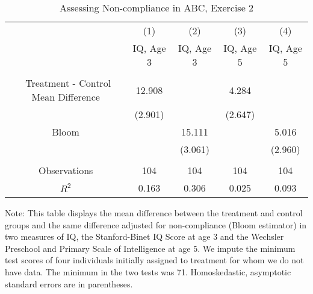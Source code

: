 \begin{table}[H] 
\begin{threeparttable}
\caption{Assessing Non-compliance in ABC, Exercise 2}
\label{table:nc2}
\centering 
\begin{tabular}{ccccc} \toprule
 & (1) & (2) & (3) & (4) \\
 & IQ, Age 3 & IQ, Age 3  & IQ, Age 5 & IQ, Age 5 \\ \midrule
 &  &  & & \\\
Treatment - Control Mean Difference & 12.908 &  & 4.284 &  \\
 & (2.901) &  & (2.647) &  \\
Bloom &  & 15.111 &  & 5.016 \\
 &  & (3.061) &  & (2.960) \\ \\ \midrule
Observations & 104 & 104 & 104 & 104 \\
 $R^2$ & 0.163 & 0.306 & 0.025 & 0.093 \\ \bottomrule
 \end{tabular}
\begin{tablenotes}
\footnotesize
\item Note: This table displays the mean difference between the treatment and control groups and the same difference adjusted for non-compliance (Bloom estimator) in two measures of IQ, the Stanford-Binet IQ Score at age 3 and the Wechsler Preschool and Primary Scale of Intelligence at age 5. We impute the minimum test scores of four individuals initially assigned to treatment for whom we do not have data. The minimum in the two tests was 71. Homoskedastic, asymptotic standard errors are in parentheses.
\end{tablenotes}
\end{threeparttable}
\end{table}

